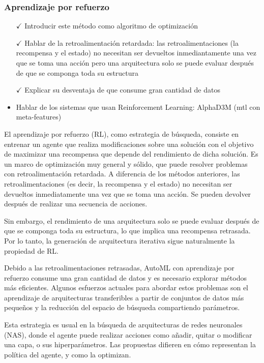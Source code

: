 \subsubsection{Aprendizaje por refuerzo}

\begin{itemize}
	\item[$\checkmark$] Introducir este método como algoritmo de optimización
	\item[$\checkmark$] Hablar de la retroalimentación retardada: las retroalimentaciones (la recompensa y el estado) no necesitan ser devueltos inmediantamente una vez que se toma una acción pero una arquitectura solo se puede evaluar después de que se componga toda su estructura
	\item[$\checkmark$] Explicar su desventaja de que consume gran cantidad de datos
	\item Hablar de los sistemas que usan Reinforcement Learning: AlphaD3M (mtl con meta-features)
\end{itemize}

El aprendizaje por refuerzo (RL), como estrategia de búsqueda, consiste en entrenar un agente que realiza modificaciones sobre una solución con el objetivo de maximizar una recompensa que depende del rendimiento de dicha solución. Es un marco de optimización muy general y sólido, que puede resolver problemas con retroalimentación retardada. A diferencia de los métodos anteriores, las retroalimentaciones (es decir, la recompensa y el estado) no necesitan ser devueltos inmediatamente una vez que se toma una acción. Se pueden devolver después de realizar una secuencia de acciones. 

Sin embargo, el rendimiento de una arquitectura solo se puede evaluar después de que se componga toda su estructura, lo que implica una recompensa retrasada. Por lo tanto, la generación de arquitectura iterativa sigue naturalmente la propiedad de RL. 

Debido a las retroalimentaciones retrasadas, AutoML con aprendizaje por refuerzo consume una gran cantidad de datos y es necesario explorar métodos más eficientes. Algunos esfuerzos actuales para abordar estos problemas son el aprendizaje de arquitecturas transferibles a partir de conjuntos de datos más pequeños y la reducción del espacio de búsqueda compartiendo parámetros.

Esta estrategia es usual en la búsqueda de arquitecturas de redes neuronales (NAS), donde el agente puede realizar acciones como añadir, quitar o modificar una capa, o sus hiperparámetros. Las propuestas difieren en cómo representan la política del agente, y como la optimizan.

